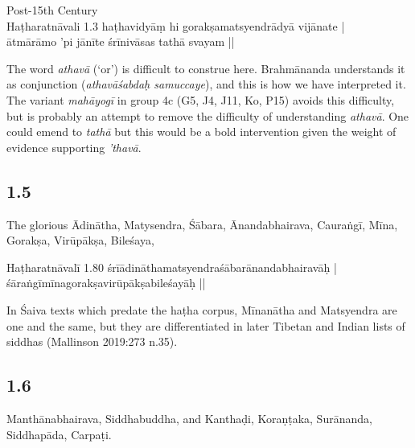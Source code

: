 \begin{ekdosis}
\begin{testimonia}[hp01_004]
Post-15th Century\\
Haṭharatnāvali 1.3
\startverse
haṭhavidyāṃ hi gorakṣamatsyendrādyā vijānate |\\
ātmārāmo 'pi jānīte śrīnivāsas tathā svayam || 
\endverse
\end{testimonia}

\begin{philcomm}[hp01_004]   
The word \emph{athavā} (‘or’) is difficult to construe here. Brahmānanda understands it as conjunction (\emph{athavāśabdaḥ samuccaye}), and this is how we have interpreted it. The variant \emph{mahāyogī} in group 4c (G5, J4, J11, Ko, P15) avoids this difficulty, but is probably an attempt to remove the difficulty of understanding \emph{athavā}. One could emend to \emph{tathā} but this would be a bold intervention given the weight of evidence supporting \emph{’thavā}.   
\end{philcomm}

\subsection*{1.5}
\begin{translation}[hp01_005]
The glorious Ādinātha, Matysendra, Śābara, Ānandabhairava, Cauraṅgī, Mīna, Gorakṣa, Virūpākṣa, Bileśaya,
\end{translation}

\begin{testimonia}[hp01_005]
Haṭharatnāvalī 1.80
\startverse
śrīādināthamatsyendraśābarānandabhairavāḥ |\\
śāraṅgīmīnagorakṣavirūpākṣabileśayāḥ || 
\endverse
\end{testimonia}

\begin{philcomm}[hp01_005]     
In Śaiva texts which predate the haṭha corpus, Mīnanātha and Matsyendra are one and the same, but they are differentiated in later Tibetan and Indian lists of siddhas (Mallinson 2019:273 n.35).   
\end{philcomm}

\subsection*{1.6}
\begin{translation}[hp01_006]
Manthānabhairava, Siddhabuddha, and Kanthaḍi, Koraṇṭaka, Surānanda, Siddhapāda, Carpaṭi.
\end{translation}


\end{ekdosis}
